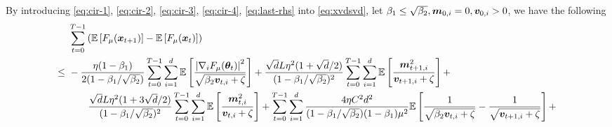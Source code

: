 \begin{appendices}

By introducing \eqref{eq:cir-1}, \eqref{eq:cir-2}, \eqref{eq:cir-3}, \eqref{eq:cir-4}, \eqref{eq:last-rhs} into \eqref{eq:xvdsvd}, let $\beta_1 \leq \sqrt{\beta_2}, {\bm{m}}_{0,i}=0,{\bm{v}}_{0,i}>0$, we have the following
\begin{equation}
\begin{aligned}
&\sum_{t=0}^{T-1}\left(\E\left[F_{\mu}(\vx_{t+1})\right] - \E\left[F_{\mu}(\vx_t)\right]\right) \\
\leq\,\,& - \frac{\eta(1-\beta_1)}{2(1-\beta_1/\sqrt{\beta_2})} \sum_{t=0}^{T-1}\sum_{i=1}^d \E\left[\frac{\left|\nabla_i F_{\mu}(\vtheta_{t})\right|^2}{\sqrt{\beta_2\vv_{t,i} + \zeta}}\right] + \frac{\sqrt{d}L\eta^2(1 + \sqrt{d}/2)}{(1-\beta_1/\sqrt{\beta_2})^2}\sum_{t=0}^{T-1}\sum_{i=1}^d\E\left[\frac{\vm_{t+1,i}^2}{\vv_{t+1,i}+\zeta}\right] + \\
&\qquad \frac{\sqrt{d}L\eta^2(1 + 3\sqrt{d}/2)}{(1-\beta_1/\sqrt{\beta_2})^2}\sum_{t=0}^{T-1}\sum_{i=1}^d\E\left[\frac{\vm_{t,i}^2}{\vv_{t,i}+\zeta}\right] + \sum_{t=0}^{T-1}\sum_{i=1}^d\frac{4\eta C^2d^2}{(1-\beta_1/\sqrt{\beta_2})(1-\beta_1)\mu^2}\E\left[\frac{1}{\sqrt{\beta_2\vv_{t,i} + \zeta}} - \frac{1}{\sqrt{\vv_{t+1,i} + \zeta}} \right] + \\

\end{aligned}
\end{equation}
\end{appendices}
